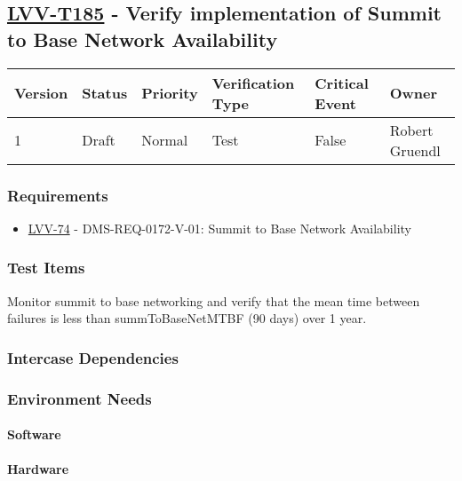 \subsection{\href{https://jira.lsstcorp.org/secure/Tests.jspa\#/testCase/LVV-T185}{LVV-T185}
    - Verify implementation of Summit to Base Network Availability}\label{lvv-t185}

\begin{longtable}[]{llllll}
\toprule
Version & Status & Priority & Verification Type & Critical Event & Owner
\\\midrule
1 & Draft & Normal &
Test & False & Robert Gruendl
\\\bottomrule
\end{longtable}

\subsubsection{Requirements}
\begin{itemize}
\item \href{https://jira.lsstcorp.org/browse/LVV-74}{LVV-74} - DMS-REQ-0172-V-01: Summit to Base Network Availability
\end{itemize}

\subsubsection{Test Items}
Monitor summit to base networking and verify that the mean time between
failures is less than summToBaseNetMTBF (90 days) over 1 year.



\subsubsection{Intercase Dependencies}

\subsubsection{Environment Needs}

\paragraph{Software}

\paragraph{Hardware}

